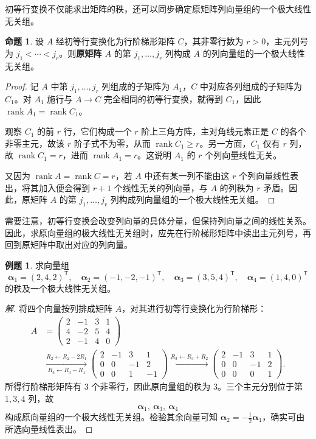 \documentclass[UTF8, fontset=fandol, a4paper, 12pt]{ctexart}
\newcommand{\rank}{\operatorname{rank}}
\theoremstyle{definition}
\newtheorem{proposition}[definition]{命题}
\newtheorem{example}[definition]{例题}
\begin{document}
初等行变换不仅能求出矩阵的秩，还可以同步确定原矩阵列向量组的一个极大线性无关组。

\begin{proposition}
设 $A$ 经初等行变换化为行阶梯形矩阵 $C$，其非零行数为 $r>0$，主元列号为 $j_1<\cdots<j_r$。则\textbf{原矩阵 $A$} 的第 $j_1,\ldots,j_r$ 列构成 $A$ 的列向量组的一个极大线性无关组。
\end{proposition}
\begin{proof}
记 $A$ 中第 $j_1,\ldots,j_r$ 列组成的子矩阵为 $A_1$，$C$ 中对应各列组成的子矩阵为 $C_1$。对 $A_1$ 施行与 $A\to C$ 完全相同的初等行变换，就得到 $C_1$，因此 $\rank A_1=\rank C_1$。

观察 $C_1$ 的前 $r$ 行，它们构成一个 $r$ 阶上三角方阵，主对角线元素正是 $C$ 的各个非零主元，故该 $r$ 阶子式不为零，从而 $\rank C_1\ge r$。另一方面，$C_1$ 仅有 $r$ 列，故 $\rank C_1=r$，进而 $\rank A_1=r$。这说明 $A_1$ 的 $r$ 个列向量线性无关。

又因为 $\rank A=\rank C=r$，若 $A$ 中还有某一列不能由这 $r$ 个列向量线性表出，将其加入便会得到 $r+1$ 个线性无关的列向量，与 $A$ 的列秩为 $r$ 矛盾。因此，原矩阵 $A$ 的第 $j_1,\ldots,j_r$ 列构成列向量组的一个极大线性无关组。
\end{proof}

需要注意，初等行变换会改变列向量的具体分量，但保持列向量之间的线性关系。因此，求原向量组的极大线性无关组时，应先在行阶梯形矩阵中读出主元列号，再回到原矩阵中取出对应的列向量。

\begin{example}
求向量组
\[
 \boldsymbol\alpha_1=(2,4,2)^{\mathsf T},\quad
 \boldsymbol\alpha_2=(-1,-2,-1)^{\mathsf T},\quad
 \boldsymbol\alpha_3=(3,5,4)^{\mathsf T},\quad
 \boldsymbol\alpha_4=(1,4,0)^{\mathsf T}
\]
的秩及一个极大线性无关组。
\end{example}
\begin{proof}[解]
将四个向量按列排成矩阵 $A$，对其进行初等行变换化为行阶梯形：
\begin{align*}
 A&=\begin{pmatrix}2&-1&3&1\\4&-2&5&4\\2&-1&4&0\end{pmatrix}\\
 &\xrightarrow[R_3\leftarrow R_3-R_1]{R_2\leftarrow R_2-2R_1}
 \begin{pmatrix}2&-1&3&1\\0&0&-1&2\\0&0&1&-1\end{pmatrix}
 \xrightarrow{R_3\leftarrow R_3+R_2}
 \begin{pmatrix}2&-1&3&1\\0&0&-1&2\\0&0&0&1\end{pmatrix}.
\end{align*}
所得行阶梯形矩阵有 $3$ 个非零行，因此原向量组的秩为 $3$。三个主元分别位于第 $1,3,4$ 列，故
\[
 \boxed{\boldsymbol\alpha_1,\ \boldsymbol\alpha_3,\ \boldsymbol\alpha_4}
\]
构成原向量组的一个极大线性无关组。检验其余向量可知 $\boldsymbol\alpha_2=-\tfrac12\boldsymbol\alpha_1$，确实可由所选向量线性表出。
\end{proof}
\end{document}
